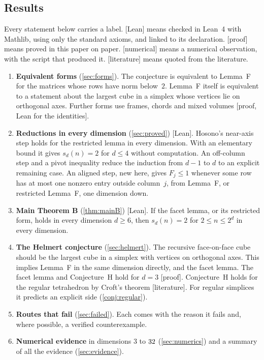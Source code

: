 \documentclass[11pt,a4paper]{article}
\newcommand{\status}[1]{\textsf{\small[#1]}}
\begin{document}
\subsection{Results}
Every statement below carries a label. \status{Lean} means checked in Lean~4 with Mathlib, using only the standard axioms, and linked to its declaration. \status{proof} means proved in this paper on paper. \status{numerical} means a numerical observation, with the script that produced it. \status{literature} means quoted from the literature.

\begin{enumerate}
\item \textbf{Equivalent forms} (\cref{sec:forms}). The conjecture is equivalent to Lemma~F for the matrices whose rows have norm below~$2$. Lemma~F itself is equivalent to a statement about the largest cube in a simplex whose vertices lie on orthogonal axes. Further forms use frames, chords and mixed volumes \status{proof, Lean for the identities}.
\item \textbf{Reductions in every dimension} (\cref{sec:proved}) \status{Lean}. Hosono's near-axis step holds for the restricted lemma in every dimension. With an elementary bound it gives $s_d(n)=2$ for $d\le 4$ without computation. An off-column step and a pivot inequality reduce the induction from $d-1$ to $d$ to an explicit remaining case. An aligned step, new here, gives $F_j\le1$ whenever some row has at most one nonzero entry outside column~$j$, from Lemma~F, or restricted Lemma~F, one dimension down.
\item \textbf{Main Theorem B} (\cref{thm:mainB}) \status{Lean}. If the facet lemma, or its restricted form, holds in every dimension $d\ge6$, then $s_d(n)=2$ for $2\le n\le 2^d$ in every dimension.
\item \textbf{The Helmert conjecture} (\cref{sec:helmert}). The recursive face-on-face cube should be the largest cube in a simplex with vertices on orthogonal axes. This implies Lemma~F in the same dimension directly, and the facet lemma. The facet lemma and Conjecture~H hold for $d=3$ \status{proof}. Conjecture~H holds for the regular tetrahedron by Croft's theorem \status{literature}. For regular simplices it predicts an explicit side (\cref{conj:regular}).
\item \textbf{Routes that fail} (\cref{sec:failed}). Each comes with the reason it fails and, where possible, a verified counterexample.
\item \textbf{Numerical evidence} in dimensions $3$ to $32$ (\cref{sec:numerics}) and a summary of all the evidence (\cref{sec:evidence}).
\end{enumerate}
\end{document}
